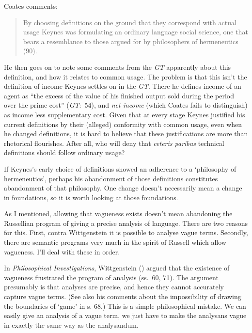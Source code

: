 \documentclass[
  11pt,
  letterpaper,
  DIV=11,
  numbers=noendperiod,
  twoside]{scrartcl}
\begin{document}
Coates comments:

\begin{quote}
By choosing definitions on the ground that they correspond with actual
usage Keynes was formulating an ordinary language social science, one
that bears a resemblance to those argued for by philosophers of
hermeneutics (90).
\end{quote}

He then goes on to note some comments from the \emph{GT} apparently
about this definition, and how it relates to common usage. The problem
is that this isn't the definition of income Keynes settles on in the
\emph{GT}. There he defines income of an agent as ``the excess of the
value of his finished output sold during the period over the prime
cost'' (\emph{GT}:~54), and \emph{net income} (which Coates fails to
distinguish) as income less supplementary cost. Given that at every
stage Keynes justified his current definitions by their (alleged)
conformity with common usage, even when he changed definitions, it is
hard to believe that these justifications are more than rhetorical
flourishes. After all, who will deny that \emph{ceteris paribus}
technical definitions should follow ordinary usage?

If Keynes's early choice of definitions showed an adherence to a
`philosophy of hermeneutics', perhaps his abandonment of those
definitions constitutes abandonment of that philosophy. One change
doesn't necessarily mean a change in foundations, so it is worth looking
at those foundations.

As I mentioned, allowing that vagueness exists doesn't mean abandoning
the Russellian program of giving a precise analysis of language. There
are two reasons for this. First, contra Wittgenstein it is possible to
analyse vague terms. Secondly, there are semantic programs very much in
the spirit of Russell which allow vagueness. I'll deal with these in
order.

In \emph{Philosophical Investigations}, Wittgenstein
() argued that the existence of
vagueness frustrated the program of analysis (ss.~60, 71). The argument
presumably is that analyses are precise, and hence they cannot
accurately capture vague terms. (See also his comments about the
impossibility of drawing the boundaries of `game' in s. 68.) This is a
simple philosophical mistake. We can easily give an analysis of a vague
term, we just have to make the analysans vague in exactly the same way
as the analysandum.
\end{document}
